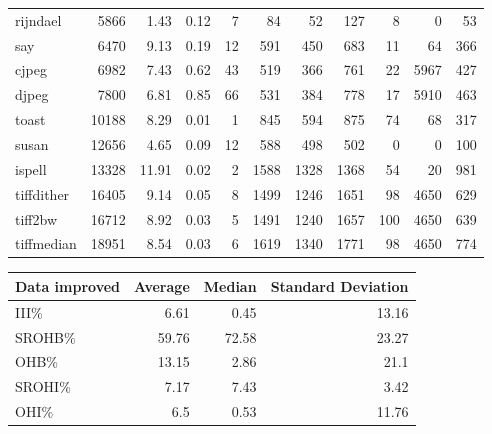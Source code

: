 \begin{tabular}{lrrrrrrrrrr}
 rijndael        &           5866 &     1.43 &   0.12 &    7 &     84 &         52 &          127 &     8 &     0 &    53 \\
 say             &           6470 &     9.13 &   0.19 &   12 &    591 &        450 &          683 &    11 &    64 &   366 \\
 cjpeg           &           6982 &     7.43 &   0.62 &   43 &    519 &        366 &          761 &    22 &  5967 &   427 \\
 djpeg           &           7800 &     6.81 &   0.85 &   66 &    531 &        384 &          778 &    17 &  5910 &   463 \\
 toast           &          10188 &     8.29 &   0.01 &    1 &    845 &        594 &          875 &    74 &    68 &   317 \\
 susan           &          12656 &     4.65 &   0.09 &   12 &    588 &        498 &          502 &     0 &     0 &   100 \\
 ispell          &          13328 &    11.91 &   0.02 &    2 &   1588 &       1328 &         1368 &    54 &    20 &   981 \\
 tiffdither      &          16405 &     9.14 &   0.05 &    8 &   1499 &       1246 &         1651 &    98 &  4650 &   629 \\
 tiff2bw         &          16712 &     8.92 &   0.03 &    5 &   1491 &       1240 &         1657 &   100 &  4650 &   639 \\
 tiffmedian      &          18951 &     8.54 &   0.03 &    6 &   1619 &       1340 &         1771 &    98 &  4650 &   774 \\
\hline
\end{tabular}\begin{tabular}{lrrr}
\hline
 Data improved   &   Average &   Median &   Standard Deviation \\
\hline
 III\%            &      6.61 &     0.45 &                13.16 \\
 SROHB\%          &     59.76 &    72.58 &                23.27 \\
 OHB\%            &     13.15 &     2.86 &                21.1  \\
 SROHI\%          &      7.17 &     7.43 &                 3.42 \\
 OHI\%            &      6.5  &     0.53 &                11.76 \\
\hline
\end{tabular}